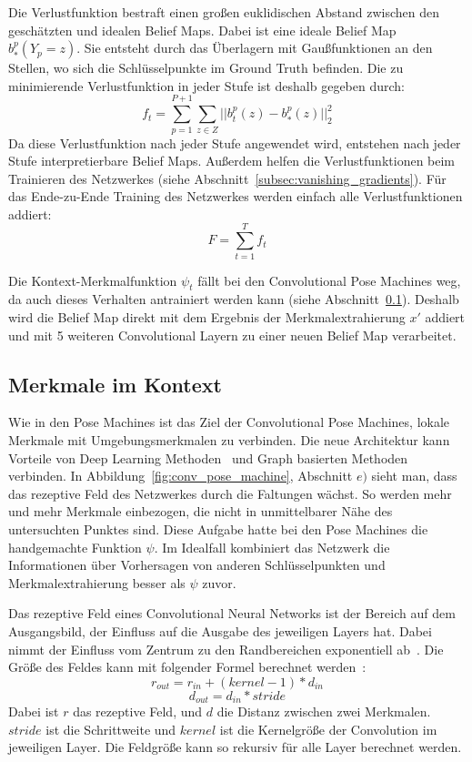 \documentclass[journal, a4paper]{IEEEtran}
\begin{document}
        Die Verlustfunktion bestraft einen großen euklidischen Abstand zwischen den geschätzten und idealen Belief Maps. Dabei ist eine ideale Belief Map $b_{*}^{p}(Y_p = z)$. Sie entsteht durch das Überlagern mit Gaußfunktionen an den Stellen, wo sich die Schlüsselpunkte im Ground Truth befinden. %
        Die zu minimierende Verlustfunktion in jeder Stufe ist deshalb gegeben durch:
        \[ f_t = \sum_{p=1}^{P+1} \sum_{z \in Z} ||b_{t}^{p}(z) - b_{*}^{p}(z) ||_{2}^{2}\]
        Da diese Verlustfunktion nach jeder Stufe angewendet wird, entstehen nach jeder Stufe interpretierbare Belief Maps. Außerdem helfen die Verlustfunktionen beim Trainieren des Netzwerkes (siehe Abschnitt~\ref{subsec:vanishing_gradients}). Für das Ende-zu-Ende Training des Netzwerkes werden einfach alle Verlustfunktionen addiert:
        \[ F = \sum_{t=1}^{T} f_t \]


        Die Kontext-Merkmalfunktion $\psi_t$ fällt bei den Convolutional Pose Machines weg, da auch dieses Verhalten antrainiert werden kann (siehe Abschnitt~\ref{subsec:kontext}). Deshalb wird die Belief Map direkt mit dem Ergebnis der Merkmalextrahierung $x'$ addiert und mit 5 weiteren Convolutional Layern zu einer neuen Belief Map verarbeitet. 

\subsection{Merkmale im Kontext}\label{subsec:kontext}
        Wie in den Pose Machines ist das Ziel der Convolutional Pose Machines, lokale Merkmale mit Umgebungsmerkmalen zu verbinden. Die neue Architektur kann Vorteile von Deep Learning Methoden~\cite{toshev2014deeppose} und Graph basierten Methoden~\cite{andriluka2009pictorial,LanWM11} verbinden. %
        In Abbildung~\ref{fig:conv_pose_machine}, Abschnitt $e)$ sieht man, dass das rezeptive Feld des Netzwerkes durch die Faltungen wächst. So werden mehr und mehr Merkmale einbezogen, die nicht in unmittelbarer Nähe des untersuchten Punktes sind. Diese Aufgabe hatte bei den Pose Machines die handgemachte Funktion $\psi$. Im Idealfall kombiniert das Netzwerk die Informationen über Vorhersagen von anderen Schlüsselpunkten und Merkmalextrahierung besser als $\psi$ zuvor.

        Das rezeptive Feld eines Convolutional Neural Networks ist der Bereich auf dem Ausgangsbild, der Einfluss auf die Ausgabe des jeweiligen Layers hat. Dabei nimmt der Einfluss vom Zentrum zu den Randbereichen exponentiell ab~\cite{dumoulin2016guide}. 
        Die Größe des Feldes kann mit folgender Formel berechnet werden~\cite{dumoulin2016guide}:
        \[ r_{out} = r_{in} + (kernel-1) * d_{in}\]
        \[ d_{out} = d_{in} * stride\]
        Dabei ist $r$ das rezeptive Feld, und $d$ die Distanz zwischen zwei Merkmalen. $stride$ ist die Schrittweite und $kernel$ ist die Kernelgröße der Convolution im jeweiligen Layer. Die Feldgröße kann so rekursiv für alle Layer berechnet werden.
        
\end{document}
